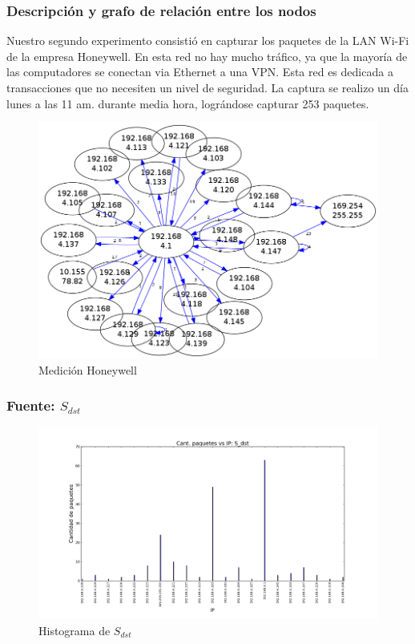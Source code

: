 \subsubsection{Descripción y grafo de relación entre los nodos}

Nuestro segundo experimento consistió en capturar los paquetes de la LAN Wi-Fi de la empresa Honeywell. En esta red no hay mucho tráfico, ya que la mayoría de las computadores se conectan via Ethernet a una VPN. Esta red es dedicada a transacciones que no necesiten un nivel de seguridad. La captura se realizo un día lunes a las 11 am. durante media hora, lográndose capturar 253 paquetes.  

\begin{figure}[H]
 \begin{center}
  \includegraphics[width=0.7\linewidth]{../imgs/red-honeywell_red.png}
  \caption{Medición Honeywell}
 \end{center}
\end{figure}


\subsubsection{Fuente: $S_{dst}$}

\begin{figure}[H]\centering
    \includegraphics[width=0.8\linewidth]{../imgs/red-honeywell_S_dst_hist.png}
    \caption{Histograma de $S_{dst}$}\label{fig:Honeywell-dst-hist}
\end{figure}

